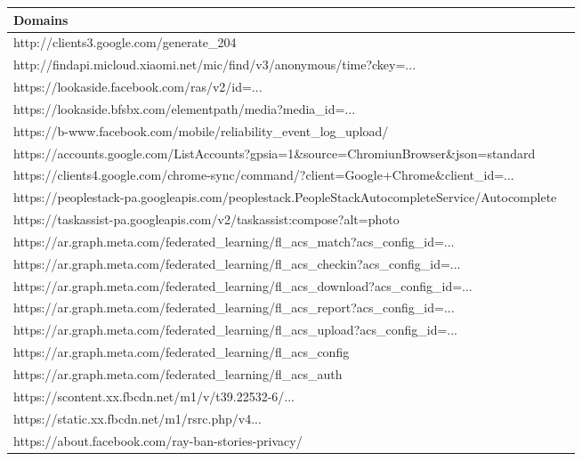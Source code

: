 \begin{table}[H]
    \centering
    \begin{tabular}{|l|l|}
        \hline
        \textbf{Domains} \\ \hline
        http://clients3.google.com/generate\_204         \\ \hline
        http://findapi.micloud.xiaomi.net/mic/find/v3/anonymous/time?ckey=... \\ \hline
        https://lookaside.facebook.com/ras/v2/id=... \\ \hline
        https://lookaside.bfsbx.com/elementpath/media?media\_id=... \\ \hline
        https://b-www.facebook.com/mobile/reliability\_event\_log\_upload/ \\ \hline
        https://accounts.google.com/ListAccounts?gpsia=1\&source=ChromiunBrowser\&json=standard \\ \hline
        https://clients4.google.com/chrome-sync/command/?client=Google+Chrome\&client\_id=... \\ \hline
        https://peoplestack-pa.googleapis.com/peoplestack.PeopleStackAutocompleteService/Autocomplete \\ \hline
        https://taskassist-pa.googleapis.com/v2/taskassist:compose?alt=photo \\ \hline
        https://ar.graph.meta.com/federated\_learning/fl\_acs\_match?acs\_config\_id=... \\ \hline
        https://ar.graph.meta.com/federated\_learning/fl\_acs\_checkin?acs\_config\_id=... \\ \hline
        https://ar.graph.meta.com/federated\_learning/fl\_acs\_download?acs\_config\_id=... \\ \hline
        https://ar.graph.meta.com/federated\_learning/fl\_acs\_report?acs\_config\_id=... \\ \hline
        https://ar.graph.meta.com/federated\_learning/fl\_acs\_upload?acs\_config\_id=... \\ \hline
        https://ar.graph.meta.com/federated\_learning/fl\_acs\_config \\ \hline
        https://ar.graph.meta.com/federated\_learning/fl\_acs\_auth \\ \hline
        https://scontent.xx.fbcdn.net/m1/v/t39.22532-6/... \\ \hline
        https://static.xx.fbcdn.net/m1/rsrc.php/v4... \\ \hline
        https://about.facebook.com/ray-ban-stories-privacy/ \\ \hline

\end{tabular}
\end{table}
